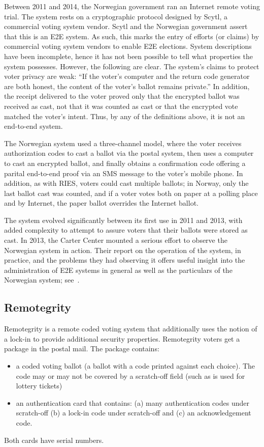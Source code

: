 Between 2011 and 2014, the Norwegian government ran an Internet remote
voting trial.  The system rests on a cryptographic protocol designed
by Scytl, a commercial voting system vendor. Scytl and the Norwegian
government assert that this is an E2E system.  As such, this marks the
entry of efforts (or claims) by commercial voting system vendors to
enable E2E elections.  System descriptions have been incomplete, hence
it has not been possible to tell what properties the system
possesses. However, the following are clear.  The system's claims to
protect voter privacy are weak: ``If the voter's computer and the
return code generator are both honest, the content of the voter's
ballot remains private.''  In addition, the receipt delivered to the
voter proved only that the encrypted ballot was received as cast, not
that it was counted as cast or that the encrypted vote matched the
voter's intent. Thus, by any of the definitions above, it is not an
end-to-end system.

The Norwegian system used a three-channel model, where the voter
receives authorization codes to cast a ballot via the postal system,
then uses a computer to cast an encrypted ballot, and finally obtains
a confirmation code offering a parital end-to-end proof via an SMS
message to the voter's mobile phone.  In addition, as with RIES,
voters could cast multiple ballots; in Norway, only the last ballot
cast was counted, and if a voter votes both on paper at a polling
place and by Internet, the paper ballot overrides the Internet ballot.

The system evolved significantly between its first use in 2011 and
2013, with added complexity to attempt to assure voters that their
ballots were stored as cast.  In 2013, the Carter Center mounted a
serious effort to observe the Norwegian system in action.  Their
report on the operation of the system, in practice, and the problems
they had observing it offers useful insight into the administration of
E2E systems in general as well as the particulars of the Norwegian
system; see~\cite{carter2013}.

\subsection{Remotegrity~\cite{zagorski2013}}

Remotegrity is a remote coded voting system that additionally uses the
notion of a lock-in to provide additional security
properties. Remotegrity voters get a package in the postal mail. The
package contains:
\begin{itemize}
  \item a coded voting ballot (a ballot with a code printed against
    each choice). The code may or may not be covered by a scratch-off
    field (such as is used for lottery tickets)
  \item an authentication card that contains: (a) many authentication
    codes under scratch-off (b) a lock-in code under scratch-off and
    (c) an acknowledgement code.
\end{itemize}
Both cards have serial numbers.

